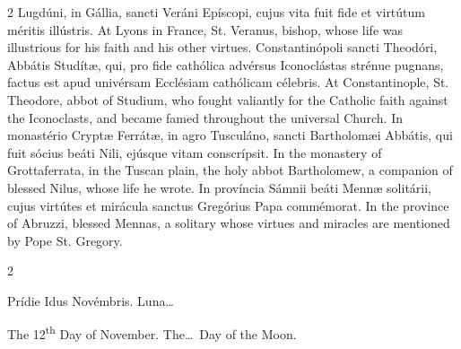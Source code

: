 \begin{paracol}{2}
Lugdúni, in Gállia, 
 sancti Veráni Epíscopi, cujus vita fuit fide et virtútum méritis illústris.
\switchcolumn
{}
At Lyons in France, St. Veranus, 
 bishop, whose life was illustrious for his faith and his other virtues.
\switchcolumn*
{}
Constantinópoli sancti 
 Theodóri, Abbátis Studítæ, qui, pro fide cathólica advérsus Iconoclástas 
 strénue pugnans, factus est apud univérsam Ecclésiam cathólicam célebris.
\switchcolumn
{}
At Constantinople, St. Theodore, 
 abbot of Studium, who fought valiantly for the Catholic faith against the 
 Iconoclasts, and became famed throughout the universal Church.
\switchcolumn*
{}
In monastério Cryptæ 
 Ferrátæ, in agro Tusculáno, sancti Bartholomæi Abbátis, qui fuit sócius 
 beáti Nili, ejúsque vitam conscrípsit.
\switchcolumn
{}
In the monastery of Grottaferrata, 
 in the Tuscan plain, the holy abbot Bartholomew, a companion of blessed 
 Nilus, whose life he wrote.
\switchcolumn*
{}
In província Sámnii 
 beáti Mennæ solitárii, cujus virtútes et mirácula sanctus Gregórius Papa 
 commémorat.
\switchcolumn
{}
In the province of Abruzzi, blessed 
 Mennas, a solitary whose virtues and miracles are mentioned by Pope St. 
 Gregory.
\switchcolumn*
{}
\end{paracol}


\begin{paracol}{2}
\begin{center}{\color{gregoriocolor} Prídie Idus Novémbris. 
 Luna\dots\ }\end{center}
\switchcolumn
{}
\begin{center}{\color{gregoriocolor} The 
 12\textsuperscript{th} Day of 
 November. The\dots\ Day of the Moon.}\end{center}
\end{paracol}

